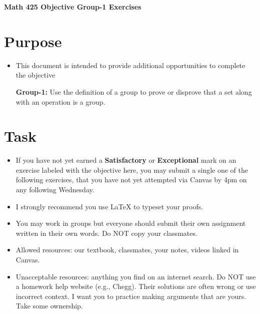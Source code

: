 \documentclass[12pt]{article}
\begin{document}
	\begin{center}
		{\Large \bf Math 425 Objective Group-1 Exercises}
	\end{center}
	\section*{Purpose}
	\begin{itemize}
		\item This document is intended to provide additional opportunities to complete the objective
		
		\textbf{Group-1:}  Use the definition of a group to prove or disprove that a set along with an operation is a group.
	\end{itemize}
	\section*{Task}
	\begin{itemize}
		\item If you have not yet earned a \textbf{Satisfactory} or \textbf{Exceptional} mark on an exercise labeled with the objective here, you may submit a single one of the following exercises, that you have not yet attempted via Canvas by 4pm on any following Wednesday.
		\item I strongly recommend you use LaTeX to typeset your proofs.
		\item You may work in groups but everyone should submit their own assignment written in their own words.  Do NOT copy your classmates.
		\item Allowed resources: our textbook, classmates, your notes, videos linked in Canvas.
		\item Unacceptable resources: anything you find on an internet search. Do NOT use a homework help website (e.g., Chegg). Their solutions are often wrong or use incorrect context.  I want you to practice making arguments that are yours. Take some ownership.
	\end{itemize}
\end{document}
